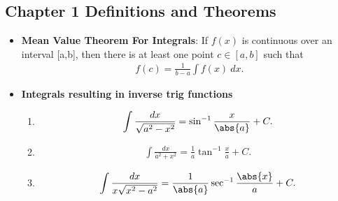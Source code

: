 \documentclass{report}
\begin{document}
    \subsection{Chapter 1 Definitions and Theorems}
    \bigbreak \noindent 
    \begin{itemize}
        \item \textbf{Mean Value Theorem For Integrals}: If  $f(x)$ is continuous over an interval  [a,b], then there is at least one point  $c\in[a,b]$ such that 
            \begin{align*}
                f(c) = \frac{1}{b-a}\int f(x)\ dx
            .\end{align*}
        \item \textbf{Integrals resulting in inverse trig functions}
            \begin{enumerate}
                \item \begin{align*}
                        \int \frac{dx}{\sqrt{a^{2}-x^{2}}} = \sin^{-1}{\frac{x}{\abs{a}}} + C
                    .\end{align*}
                \item \begin{align*}
                        \int \frac{dx}{a^{2}+x^{2}} = \frac{1}{a}\tan^{-1}{\frac{x}{a}} + C
                    .\end{align*}
                \item \begin{align*}
                        \int \frac{dx}{x\sqrt{x^{2}-a^{2}}} = \frac{1}{\abs{a}}\sec^{-1}{\frac{\abs{x}}{a}} + C
                    .\end{align*}
            \end{enumerate}
    \end{itemize}
\end{document}

